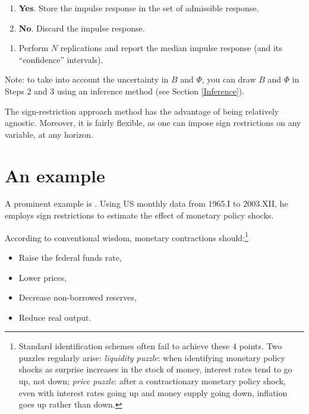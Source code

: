 \documentclass[
  12pt,
]{book}
\providecommand{\tightlist}{%
  \setlength{\itemsep}{0pt}\setlength{\parskip}{0pt}}
\theoremstyle{definition}
\theoremstyle{definition}
\theoremstyle{definition}
\theoremstyle{definition}
\theoremstyle{remark}
\begin{document}
\begin{enumerate}
\def\labelenumi{\alph{enumi}.}
\tightlist
\item
  \textbf{Yes}. Store the impulse response in the set of admissible response.
\item
  \textbf{No}. Discard the impulse response.
\end{enumerate}

\begin{enumerate}
\def\labelenumi{\arabic{enumi}.}
\setcounter{enumi}{4}
\tightlist
\item
  Perform \(N\) replications and report the median impulse response (and its ``confidence'' intervals).
\end{enumerate}

Note: to take into account the uncertainty in \(B\) and \(\Phi\), you can draw \(B\) and \(\Phi\) in Steps 2 and 3 using an inference method (see Section \ref{Inference}).

The sign-restriction approach method has the advantage of being relatively agnostic. Moreover, it is fairly flexible, as one can impose sign restrictions on any variable, at any horizon.

\section{An example}\label{an-example}

A prominent example is \citet{Uhlig_2005}. Using US monthly data from 1965.I to 2003.XII, he employs sign restrictions to estimate the effect of monetary policy shocks.

According to conventional wisdom, monetary contractions should:\footnote{Standard identification schemes often fail to achieve these 4 points. Two puzzles regularly arise: \emph{liquidity puzzle}: when identifying monetary policy shocks as surprise increases in the stock of money, interest rates tend to go up, not down; \emph{price puzzle}: after a contractionary monetary policy shock, even with interest rates going up and money supply going down, inflation goes up rather than down.}

\begin{itemize}
\tightlist
\item
  Raise the federal funds rate,
\item
  Lower prices,
\item
  Decrease non-borrowed reserves,
\item
  Reduce real output.
\end{itemize}
\end{document}
